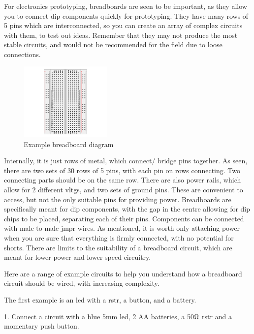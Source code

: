 \documentclass[a4paper,11pt]{report}
\newcommand{\Examples}[1] %
{
\par\noindent %
\phantomsection %
\todo[inline, color=red!30]{\textbf{#1}} %
\vspace{1em} %
}
\newcommand{\Quiz}[1] %
{
\par\noindent %
\phantomsection %
\todo[inline, color=blue!30]{\textbf{#1}} %
\vspace{1em} %
}
\begin{document}
For electronics prototyping, breadboards are seen to be important, as they allow you to connect \gls{dip} components quickly for prototyping. They have many rows of 5 pins which are interconnected, so you can create an array of complex circuits with them, to test out ideas. Remember that they may not produce the most stable circuits, and would not be recommended for the field due to loose connections.

\begin{figure}[H]
\centering
\includegraphics[width=0.4\textwidth]{breadboard}
\caption{Example breadboard diagram}
\end{figure}

Internally, it is just rows of metal, which connect/ bridge pins together. As seen, there are two sets of 30 rows of 5 pins, with each pin on rows connecting. Two connecting parts should be on the same row. There are also power rails, which allow for 2 different \gls{vltg}s, and two sets of ground pins. These are convenient to access, but not the only suitable pins for providing power. Breadboards are specifically meant for \gls{dip} components, with the gap in the centre allowing for \gls{dip} chips to be placed, separating each of their pins. Components can be connected with male to male \gls{jmpr} wires. As mentioned, it is worth only attaching power when you are sure that everything is firmly connected, with no potential for shorts. There are limits to the suitability of a breadboard circuit, which are meant for lower power and lower speed circuitry.

\Examples{Examples}

Here are a range of example circuits to help you understand how a breadboard circuit should be wired, with increasing complexity.

The first example is an \gls{led} with a \gls{rstr}, a button, and a battery.

\Quiz{Challenges}

1. Connect a circuit with a blue 5mm led, 2 AA batteries, a 50$\ohm$ \gls{rstr} and a momentary push button.
\end{document}
